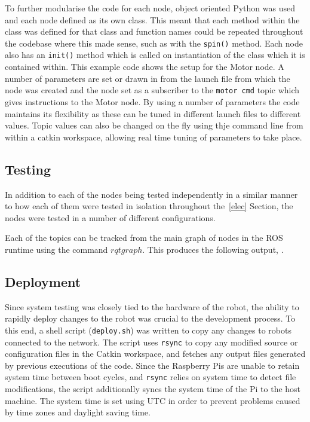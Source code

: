 To further modularise the code for each node, object oriented Python was used and
each node defined as its own class. This meant that each method within the class
was defined for that class and function names could be repeated throughout the
codebase where this made sense, such as with the \verb|spin()| method. Each node also
has an \verb|init()| method which is called on instantiation of the class which it
is contained within. This  example code shows the setup
for the Motor node. A number of parameters are set or drawn in from the launch
file from which the node was created and the node set as a subscriber to the
\verb|motor cmd| topic which gives instructions to the Motor node. By using a number of parameters the code maintains its flexibility as these can be tuned in different launch files to different values. Topic values can also be changed on the fly using thje command line from within a catkin workspace, allowing real time tuning of parameters to take place.


\subsection{Testing}\label{soft/ROS/test}
In addition to each of the nodes being tested independently in a similar manner to how each of them were tested in isolation throughout the~\ref{elec} Section, the nodes were tested in a number of different configurations.

Each of the topics can be tracked from the main graph of nodes in the ROS runtime using the command $rqt graph$. This produces the following output, .


\subsection{Deployment}\label{soft/ROS/deploy}
Since system testing was closely tied to the hardware of the robot, the ability to rapidly deploy changes to the robot was crucial to the development process. To this end, a shell script (\verb|deploy.sh|) was written to copy any changes to robots connected to the network. The script uses \verb|rsync| to copy any modified source or configuration files in the Catkin workspace, and fetches any output files generated by previous executions of the code. Since the Raspberry Pis are unable to retain system time between boot cycles, and \verb|rsync| relies on system time to detect file modifications, the script additionally syncs the system time of the Pi to the host machine. The system time is set using UTC in order to prevent problems caused by time zones and daylight saving time.


